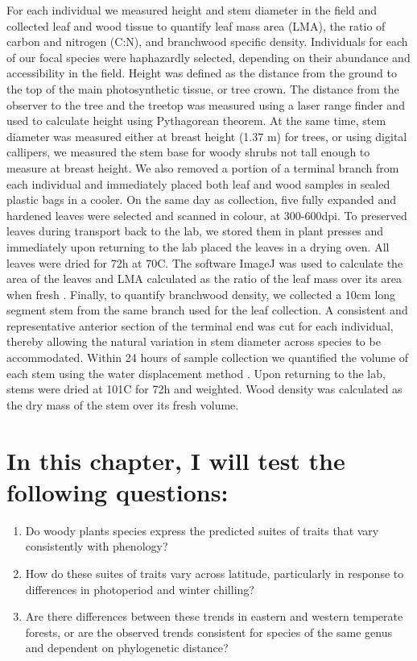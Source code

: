 \documentclass[11pt,a4paper,oneside]{article}
\begin{document}
\par For each individual we measured height and stem diameter in the field and collected leaf and wood tissue to quantify leaf mass area (LMA), the ratio of carbon and nitrogen (C:N), and branchwood specific density. Individuals for each of our focal species were haphazardly selected, depending on their abundance and accessibility in the field. Height was defined as the distance from the ground to the top of the main photosynthetic tissue, or tree crown. The distance from the observer to the tree and the treetop was measured using a laser range finder and used to calculate height using Pythagorean theorem. At the same time, stem diameter was measured either at breast height (1.37 m) for trees, or using digital callipers, we measured the stem base for woody shrubs not tall enough to measure at breast height.  We also removed a portion of a terminal branch from each individual and immediately placed both leaf and wood samples in sealed plastic bags in a cooler. On the same day as collection, five fully expanded and hardened leaves were selected and scanned in colour, at 300-600dpi. To preserved leaves during transport back to the lab, we stored them in plant presses and immediately upon returning to the lab placed the leaves in a drying oven. All leaves were dried for 72h at 70C. The software ImageJ was used to calculate the area of the leaves and LMA calculated as the ratio of the leaf mass over its area when fresh \cite{Perez-Harguindeguy2013}. Finally, to quantify branchwood density, we collected a 10cm long segment stem from the same branch used for the leaf collection. A consistent and representative anterior section of the terminal end was cut for each individual, thereby allowing the natural variation in stem diameter across species to be accommodated. Within 24 hours of sample collection we quantified the volume of each stem using the water displacement method \cite{Perez-Harguindeguy2013}. Upon returning to the lab, stems were dried at 101C for 72h and weighted. Wood density was calculated as the dry mass of the stem over its fresh volume.  


\section*{In this chapter, I will test the following questions:}
\begin{enumerate}
\item Do woody plants species express the predicted suites of traits that vary consistently with phenology? 
\item How do these suites of traits vary across latitude, particularly in response to differences in photoperiod and winter chilling?
\item Are there differences between these trends in eastern and western temperate forests, or are the observed trends consistent for species of the same genus and dependent on phylogenetic distance?

\end{enumerate}
\par %
\end{document}
